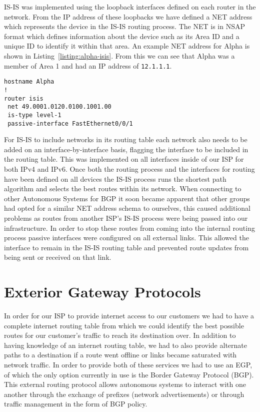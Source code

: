 IS-IS was implemented using the loopback interfaces defined on each router in
the network. From the IP address of these loopbacks we have defined a NET
address which represents the device in the IS-IS routing process. The NET is in
NSAP format which defines information about the device such as its Area ID and
a unique ID to identify it within that area. An example NET address for Alpha
is shown in Listing~\ref{listing:alpha-isis}. From this we can see that Alpha
was a member of Area 1 and had an IP address of \texttt{12.1.1.1}.

\begin{lstlisting}[caption={Alpha IS-IS Configuration}, label={listing:alpha-isis}]
hostname Alpha
!
router isis
 net 49.0001.0120.0100.1001.00
 is-type level-1
 passive-interface FastEthernet0/0/1
\end{lstlisting}

For IS-IS to include networks in its routing table each network also needs to be
added on an interface-by-interface basis, flagging the interface to be included
in the routing table. This was implemented on all interfaces inside of our ISP
for both IPv4 and IPv6. Once both the routing process and the interfaces for
routing have been defined on all devices the IS-IS process runs the shortest
path algorithm and selects the best routes within its network. When connecting
to other Autonomous Systems for BGP it soon became apparent that other groups
had opted for a similar NET address schema to ourselves, this caused additional
problems as routes from another ISP's IS-IS process were being passed into our
infrastructure. In order to stop these routes from coming into the internal
routing process passive interfaces were configured on all external links. This
allowed the interface to remain in the IS-IS routing table and prevented route
updates from being sent or received on that link.

\section{Exterior Gateway Protocols}
In order for our ISP to provide internet access to our customers we had to have
a complete internet routing table from which we could identify the best
possible routes for our customer's traffic to reach its destination over. In
addition to having knowledge of an internet routing table, we had to also
provide alternate paths to a destination if a route went offline or links
became saturated with network traffic. In order to provide both of these
services we had to use an EGP, of which the only option currently in use is the
Border Gateway Protocol (BGP). This external routing protocol allows autonomous
systems to interact with one another through the exchange of prefixes (network
advertisements) or through traffic management in the form of BGP policy.

